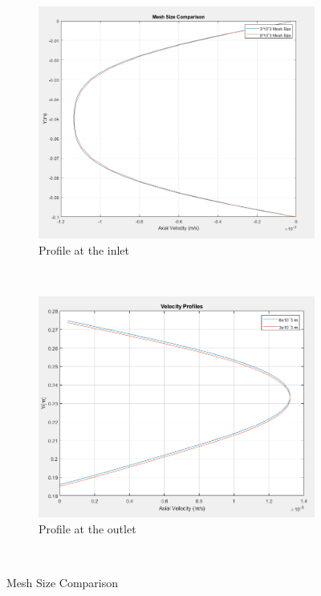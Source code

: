 \begin{figure}[H]
 \centering
\begin{subfigure}{.45\textwidth}
  \centering
  \includegraphics[width=.87\linewidth]{images/task1/3vs6mesh.png}
  \caption{Profile at the inlet}
  \label{fig:x_d_norm}
\end{subfigure}%
~
\begin{subfigure}{.45\textwidth}
  \centering
  \includegraphics[width=.9\linewidth]{images/task1/outlet_mesh_comparison.png}
  \caption{Profile at the outlet}
  \label{fig:x_d_norm_actual}
\end{subfigure}
~
\caption{Mesh Size Comparison}
\label{fig:mesh_comp}
\end{figure}
